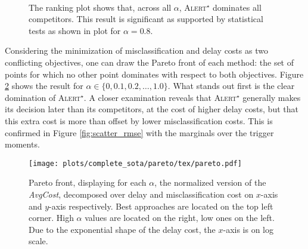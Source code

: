 \documentclass[sigconf, nonacm, table]{acmart}
\begin{document}
\begin{figure}[!htb]
    \centering
     \\
    \caption{The ranking plot \protect{} shows that, across all $\alpha$, \textsc{Alert$^{\star}$} dominates all competitors. This result is significant as supported by statistical tests as shown in plot \protect{} for $\alpha = 0.8$.}
    \label{fig:ranks_sota}
\end{figure}

Considering the minimization of misclassification and delay costs as two conflicting objectives, one can draw the Pareto front of each method: the set of points for which no other point dominates with respect to both objectives. Figure \ref{fig:pareto_sota} shows the result for $\alpha \in \{0, 0.1, 0.2, \ldots, 1.0\}$. What stands out first is the clear domination of \textsc{Alert}$^\star$. A closer examination reveals that \textsc{Alert}$^\star$ generally makes its decision later than its competitors, at the cost of higher delay costs, but that this extra cost is more than offset by lower misclassification costs. This is confirmed in Figure \ref{fig:scatter_rmse} with the marginals over the trigger moments. 


\begin{figure}[!htb]
    \centering
    \texttt{[image: plots/complete\_sota/pareto/tex/pareto.pdf]}
    \caption{Pareto front, displaying for each $\alpha$, the normalized version of the \textit{AvgCost}, decomposed over delay and misclassification cost on $x$-axis and $y$-axis respectively. Best approaches are located on the top left corner. High $\alpha$ values are located on the right, low ones on the left. Due to the exponential shape of the delay cost, the $x$-axis is on log scale.}
    \label{fig:pareto_sota}
\end{figure}
\end{document}
